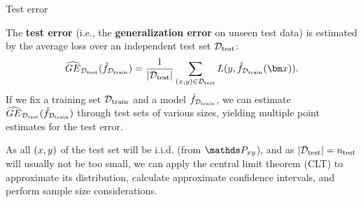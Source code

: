 \begin{vbframe}{Test error}
%
%
%

The \textbf{test error} (i.e., the \textbf{generalization error} on unseen test data) is
estimated by the average loss over an independent test set $\mathcal{D}_{\text{test}}$:
$$\GEh{\Dtest}(\fhDtrain) = \frac{1}{|\Dtest|} \sum_{\xy \in \Dtest} L(y, \fhDtrain(\xv)).$$
%
If we fix a training set $\mathcal{D}_{\text{train}}$ and a model $\hat{f}_{\mathcal{D}_{\text{train}}}$, we can estimate $\widehat{GE}_{\mathcal{D}_{\text{test}}}(\hat{f}_{\mathcal{D}_{\text{train}}})$ through test sets of various sizes, yielding multiple point estimates for the test error.

\lz
As all $(x, y)$ of the test set will be i.i.d. (from $\Pxy$),
 and as $|\mathcal{D}_{\text{test}}| = n_{\text{test}}$ will usually not be too small, we can apply the central limit theorem (CLT) to
 approximate its distribution, calculate approximate confidence intervals, and perform
 sample size considerations.
\end{vbframe}




